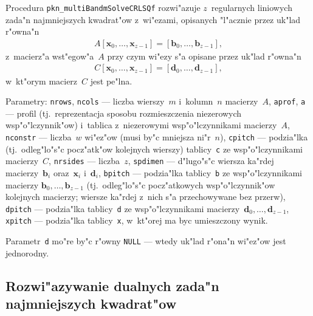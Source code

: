\vspace{\bigskipamount}
Procedura \texttt{pkn\_multiBandmSolveCRLSQf} rozwi"azuje $z$~regularnych
liniowych zada"n najmniejszych kwadrat"ow z~wi"ezami, opisanych "l"acznie
przez uk"lad r"owna"n
\begin{align*}
  A[\bm{x}_0,\ldots,\bm{x}_{z-1}] = [\bm{b}_0,\ldots,\bm{b}_{z-1}],
\end{align*}
z~macierz"a wst"egow"a~$A$ przy czym wi"ezy s"a opisane przez uk"lad r"owna"n
\begin{align*}
  C[\bm{x}_0,\ldots,\bm{x}_{z-1}] = [\bm{d}_0,\ldots,\bm{d}_{z-1}],
\end{align*}
w~kt"orym macierz~$C$ jest pe"lna.

Parametry:
\texttt{nrows}, \texttt{ncols} --- liczba wierszy~$m$ i~kolumn~$n$ macierzy~$A$,
\texttt{aprof}, \texttt{a} --- profil (tj.\ reprezentacja sposobu rozmieszczenia
niezerowych wsp"o"lczynnik"ow) i~tablica z~niezerowymi
wsp"o"lczynnikami macierzy~$A$, \texttt{nconstr} --- liczba~$w$ wi"ez"ow
(musi by"c mniejsza ni"r~$n$), \texttt{cpitch} --- podzia"lka (tj.\ odleg"lo"s"c
pocz"atk"ow kolejnych wierszy) tablicy~\texttt{c} ze wsp"o"lczynnikami
macierzy~$C$, \texttt{nrsides} --- liczba~$z$, \texttt{spdimen} --- d"lugo"s"c
wiersza ka"rdej macierzy~$\bm{b}_i$ oraz~$\bm{x}_i$ i~$\bm{d}_i$,
\texttt{bpitch} --- podzia"lka tablicy~\texttt{b} ze wsp"o"lczynnikami macierzy
$\bm{b}_0,\ldots,\bm{b}_{z-1}$ (tj.\ odleg"lo"s"c pocz"atkowych
wsp"o"lczynnik"ow kolejnych macierzy; wiersze ka"rdej z~nich s"a przechowywane
bez przerw), \texttt{dpitch} --- podzia"lka tablicy~\texttt{d} ze
wsp"o"lczynnikami macierzy~$\bm{d}_0,\ldots,\bm{d}_{z-1}$,
\texttt{xpitch} --- podzia"lka tablicy~\texttt{x}, w~kt"orej ma byc
umieszczony wynik.

Parametr~\texttt{d} mo"re by"c r"owny \texttt{NULL} --- wtedy uk"lad r"ona"n
wi"ez"ow jest jednorodny.


\subsection{Rozwi"azywanie dualnych zada"n najmniejszych kwadrat"ow}

